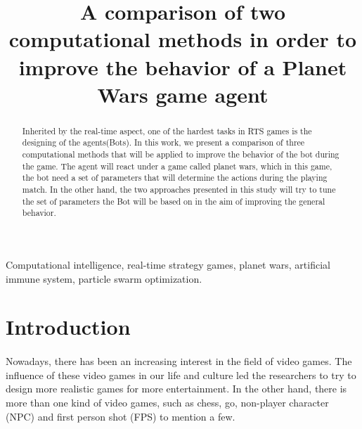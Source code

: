 \documentclass[]{interact}
\theoremstyle{plain}%
\theoremstyle{definition}
\theoremstyle{remark}
\begin{document}

\title{A comparison of two computational methods in order to improve the behavior of a Planet Wars game agent}

\author{
}

\maketitle

\begin{abstract}
Inherited by the real-time aspect, one of the hardest tasks in RTS games is the designing of the agents(Bots). In this work, we present a comparison of three computational methods that will be applied to improve the behavior of the bot during the game. The agent will react under a game called planet wars, which in this game, the bot need a set of parameters that will determine the actions during the playing match. In the other hand, the two approaches presented in this study will try to tune the set of parameters the Bot will be based on in the aim of improving the general behavior.
\end{abstract}

\begin{keywords}
Computational intelligence, real-time strategy
games, planet wars, artificial immune system, particle swarm optimization.
\end{keywords}


\section{Introduction}
\paragraph*{} 
Nowadays, there has been an increasing interest in the field of video games. The influence of these video games in our life and culture led the researchers to try to design more realistic games for more entertainment. In the other hand, there is more than one kind of video games, such as chess, go, non-player character (NPC) and first
person shot (FPS) to mention a few. 
\end{document}
